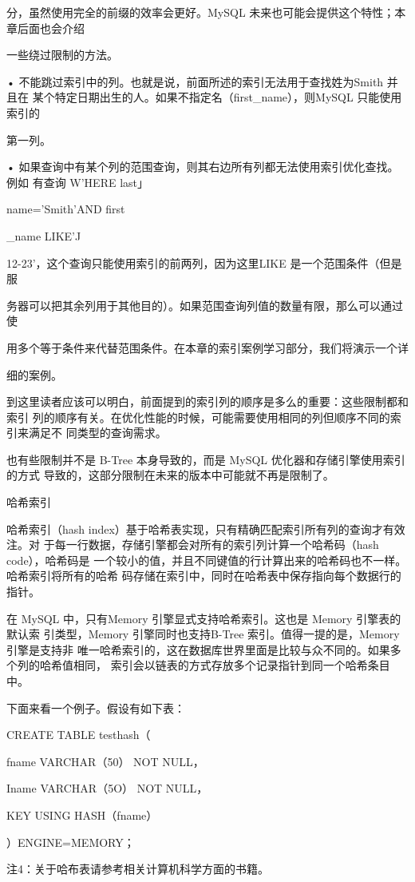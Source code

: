 分，虽然使用完全的前缀的效率会更好。MySQL 未来也可能会提供这个特性；本章后面也会介绍

一些绕过限制的方法。

• 不能跳过索引中的列。也就是说，前面所述的索引无法用于查找姓为Smith 并且在
某个特定日期出生的人。如果不指定名（first\_name），则MySQL 只能使用索引的

第一列。

• 如果查询中有某个列的范围查询，则其右边所有列都无法使用索引优化查找。例如
有查询 W'HERE last」

name='Smith'AND first

\_name LIKE'J%

12-23'，这个查询只能使用索引的前两列，因为这里LIKE 是一个范围条件（但是服

务器可以把其余列用于其他目的）。如果范围查询列值的数量有限，那么可以通过使

用多个等于条件来代替范围条件。在本章的索引案例学习部分，我们将演示一个详

细的案例。

到这里读者应该可以明白，前面提到的索引列的顺序是多么的重要：这些限制都和索引
列的顺序有关。在优化性能的时候，可能需要使用相同的列但顺序不同的索引来满足不
同类型的查询需求。

也有些限制并不是 B-Tree 本身导致的，而是 MySQL 优化器和存储引擎使用索引的方式
导致的，这部分限制在未来的版本中可能就不再是限制了。

哈希索引

哈希索引（hash index）基于哈希表实现，只有精确匹配索引所有列的查询才有效注。对
于每一行数据，存储引擎都会对所有的索引列计算一个哈希码（hash code），哈希码是
一个较小的值，并且不同键值的行计算出来的哈希码也不一样。哈希索引将所有的哈希
码存储在索引中，同时在哈希表中保存指向每个数据行的指针。

在 MySQL 中，只有Memory 引擎显式支持哈希索引。这也是 Memory 引擎表的默认索
引类型，Memory 引擎同时也支持B-Tree 索引。值得一提的是，Memory 引擎是支持非
唯一哈希索引的，这在数据库世界里面是比较与众不同的。如果多个列的哈希值相同，
索引会以链表的方式存放多个记录指针到同一个哈希条目中。

下面来看一个例子。假设有如下表：

CREATE TABLE testhash（

fname VARCHAR（50） NOT NULL，

Iname VARCHAR（5O） NOT NULL，

KEY USING HASH（fname）

）ENGINE=MEMORY；

注4：关于哈布表请参考相关计算机科学方面的书籍。

